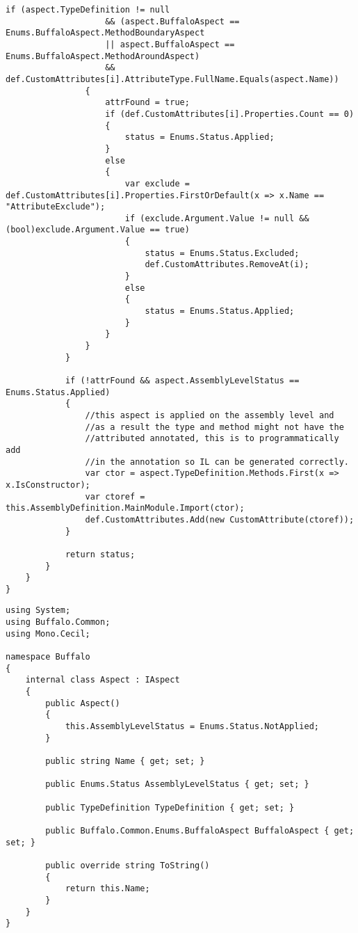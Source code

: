 \begin{lstlisting}[caption={../buffalo/Weaver.cs}, label=../buffalo/Weaver.cs, frame=tb, basicstyle=\scriptsize]
                if (aspect.TypeDefinition != null
                    && (aspect.BuffaloAspect == Enums.BuffaloAspect.MethodBoundaryAspect
                    || aspect.BuffaloAspect == Enums.BuffaloAspect.MethodAroundAspect)
                    && def.CustomAttributes[i].AttributeType.FullName.Equals(aspect.Name))
                {
                    attrFound = true;
                    if (def.CustomAttributes[i].Properties.Count == 0)
                    {
                        status = Enums.Status.Applied;
                    }
                    else
                    {
                        var exclude = def.CustomAttributes[i].Properties.FirstOrDefault(x => x.Name == "AttributeExclude");
                        if (exclude.Argument.Value != null && (bool)exclude.Argument.Value == true)
                        {
                            status = Enums.Status.Excluded;
                            def.CustomAttributes.RemoveAt(i);
                        }
                        else
                        {
                            status = Enums.Status.Applied;
                        }
                    }
                }
            }

            if (!attrFound && aspect.AssemblyLevelStatus == Enums.Status.Applied)
            {
                //this aspect is applied on the assembly level and
                //as a result the type and method might not have the
                //attributed annotated, this is to programmatically add
                //in the annotation so IL can be generated correctly.
                var ctor = aspect.TypeDefinition.Methods.First(x => x.IsConstructor);
                var ctoref = this.AssemblyDefinition.MainModule.Import(ctor);
                def.CustomAttributes.Add(new CustomAttribute(ctoref));
            }

            return status;
        }
    }
}\end{lstlisting}

\begin{lstlisting}[caption={../buffalo/Aspect.cs}, label=../buffalo/Aspect.cs, frame=tb, basicstyle=\scriptsize]﻿using System;
using Buffalo.Common;
using Mono.Cecil;

namespace Buffalo
{
    internal class Aspect : IAspect
    {
        public Aspect()
        {
            this.AssemblyLevelStatus = Enums.Status.NotApplied;
        }

        public string Name { get; set; }

        public Enums.Status AssemblyLevelStatus { get; set; }

        public TypeDefinition TypeDefinition { get; set; }

        public Buffalo.Common.Enums.BuffaloAspect BuffaloAspect { get; set; }

        public override string ToString()
        {
            return this.Name;
        }
    }
}
\end{lstlisting}


